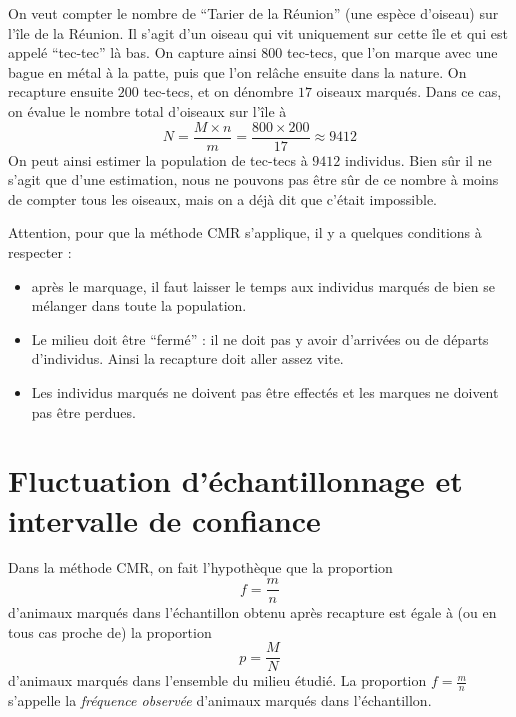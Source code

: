 \documentclass[11pt]{article}
\begin{document}
\begin{exemple}
  On veut compter le nombre de ``Tarier de la Réunion'' (une espèce d'oiseau)
  sur l'île de la Réunion. Il s'agit d'un oiseau qui vit uniquement sur cette
  île et qui est appelé ``tec-tec'' là bas. On capture ainsi $800$ tec-tecs, que
  l'on marque avec une bague en métal à la patte, puis que l'on rel\^ache
  ensuite dans la nature. On recapture ensuite $200$ tec-tecs, et on dénombre
  $17$ oiseaux marqués. Dans ce cas, on évalue le nombre total d'oiseaux sur
  l'île à
  \[
    N = \frac{M\times n}{m} = \frac{800\times 200}{17}\approx9412
  \]
  On peut ainsi estimer la population de tec-tecs à $9412$ individus. Bien sûr
  il ne s'agit que d'une estimation, nous ne pouvons pas être sûr de ce nombre à
  moins de compter tous les oiseaux, mais on a déjà dit que c'était impossible.
\end{exemple}
\begin{rmq}
  Attention, pour que la méthode CMR s'applique, il y a quelques conditions à
  respecter :
  \begin{itemize}
    \item après le marquage, il faut laisser le temps aux individus marqués de
      bien se mélanger dans toute la population.
    \item Le milieu doit être ``fermé'' : il ne doit pas y avoir d'arrivées ou
      de départs d'individus. Ainsi la recapture doit aller assez vite.
    \item Les individus marqués ne doivent pas être effectés et les marques ne
      doivent pas être perdues.
  \end{itemize}
\end{rmq}

\section{Fluctuation d'échantillonnage et intervalle de confiance}

Dans la méthode CMR, on fait l'hypothèque que la proportion
\[
  f = \frac{m}{n}
\]
d'animaux marqués dans l'échantillon obtenu après recapture est égale à (ou en
tous cas proche de) la proportion
\[
  p = \frac{M}{N}
\]
d'animaux marqués dans l'ensemble du milieu étudié. La proportion
$f=\frac{m}{n}$ s'appelle la \emph{fréquence observée} d'animaux marqués dans
l'échantillon.
\end{document}
